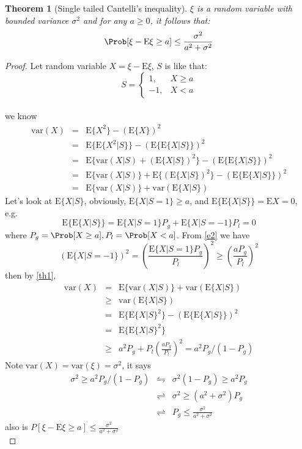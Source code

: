 \documentclass[12pt]{amsart}
\newtheorem{theorem}{Theorem}
\begin{document}
\begin{theorem}[Single tailed Cantelli's inequality]\label{Can}
$\xi$ is a random variable with bounded variance $\sigma^2$ and for any $a\geq 0$, it
follows that:
$$\Prob[\xi-\mathrm{E}\xi\geq a]\leq \frac{\sigma^2}{a^2+\sigma^2}$$
\end{theorem}
\begin{proof}Let random variable $X=\xi-\textrm{E}\xi$,
$S$ is like that:
\[ S=\left\{ \begin{array}{rr} 1, & X\geq a\\ -1, & X<a \end{array}
\right. \] \\we know
\begin{eqnarray}\label{th1}
\nonumber
\text{var}(X)&=&\textrm{E}\{X^2\}-(\textrm{E}\{X\})^2\\&=&\nonumber
\textrm{E}\{\textrm{E}\{X^2|S\}\}-(\textrm{E}\{\textrm{E}\{X|S\}\})^2\\&=&\nonumber
\textrm{E}\{\text{var}(X|S)+(\textrm{E}\{X|S\})^2\}-(\textrm{E}\{\textrm{E}\{X|S\}\})^2\\&=&\nonumber
\textrm{E}\{\text{var}(X|S)\}+\textrm{E}\{(\textrm{E}\{X|S\})^2\}-(\textrm{E}\{\textrm{E}\{X|S\}\})^2\\&=&
\textrm{E}\{\text{var}(X|S)\}+\text{var}(\textrm{E}\{X|S\})
\end{eqnarray}
Let's look at $\textrm{E}\{X|S\}$,
obviously, $\textrm{E}\{X|S=1\}\geq a$, and
$\textrm{E}\{\textrm{E}\{X|S\}\}=\textrm{E}X=0$, e.g.
\begin{equation}\label{e2}
\textrm{E}\{\textrm{E}\{X|S\}\}=\textrm{E}\{X|S=1\}P_g+\textrm{E}\{X|S=-1\}P_l=0
\end{equation}
where $P_g=\Prob[X\geq a],P_l=\Prob[X<a]$.
From \eqref{e2} we have
\begin{equation}\label{e3}
(\textrm{E}\{X|S=-1\})^2=\left(\frac{\textrm{E}\{X|S=1\}P_g}{P_l}\right)^2\geq \left(\frac{aP_g}{P_l}\right)^2
\end{equation}
then by \eqref{th1}, \\
\begin{eqnarray*}
\text{var}(X)&=&\textrm{E}\{\text{var}(X|S)\}+\text{var}(\textrm{E}\{X|S\})\\
&\geq&\text{var}(\textrm{E}\{X|S\})\\
&=&\textrm{E}\{\textrm{E}\{X|S\}^2\}-(\textrm{E}\{\textrm{E}\{X|S\}\})^2\\
&=&\textrm{E}\{\textrm{E}\{X|S\}^2\}\\
&\geq& a^2P_g+P_l(\frac{aP_g}{P_l})^2=a^2P_g/(1-P_g)
\end{eqnarray*}
Note $\text{var}(X)=\text{var}(\xi)=\sigma^2$, it says
\begin{eqnarray*}
\sigma^2\geq a^2P_g/(1-P_g)&\leftrightharpoons& \sigma^2(1-P_g)\geq a^2P_g\\
&\rightleftharpoons & \sigma^2\geq (a^2+\sigma^2)P_g\\
&\rightleftharpoons & P_g\leq \frac{\sigma^2}{a^2+\sigma^2}
\end{eqnarray*}
also is $P[\xi-\textrm{E}\xi\geq
a]\leq \frac{\sigma^2}{a^2+\sigma^2}$\\
\end{proof}
\end{document}

